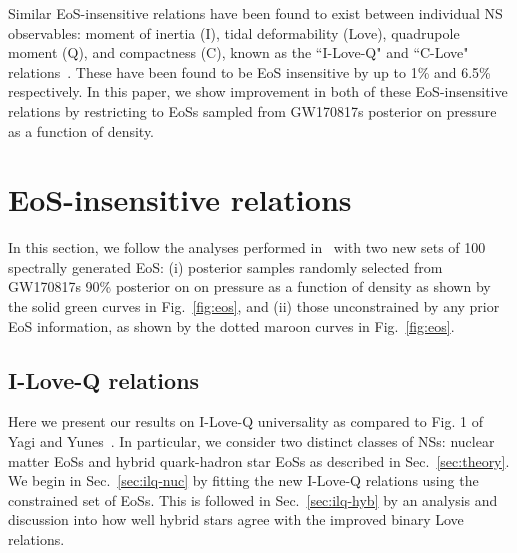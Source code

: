 \documentclass[prd,twocolumn,nofootinbib,superscriptaddress,amsmath,amssymb]{revtex4-1}
\begin{document}
Similar EoS-insensitive relations have been found to exist between individual NS observables: moment of inertia (I), tidal deformability (Love), quadrupole moment (Q), and compactness (C), known as the ``I-Love-Q" and ``C-Love" relations~\cite{Yagi:ILQ, Yagi:binLove}.
These have been found to be EoS insensitive by up to 1\% and 6.5\% respectively.
In this paper, we show improvement in both of these EoS-insensitive relations by restricting to EoSs sampled from GW170817s posterior on pressure as a function of density.
\section{EoS-insensitive relations}\label{sec:universal}
In this section, we follow the analyses performed in~\cite{Yagi:binLove,Yagi:ILQ} with two new sets of 100 spectrally generated EoS: (i) posterior samples randomly selected from GW170817s 90\% posterior on on pressure as a function of density as shown by the solid green curves in Fig.~\ref{fig:eos}, and (ii) those unconstrained by any prior EoS information, as shown by the dotted maroon curves in Fig.~\ref{fig:eos}.

\subsection{I-Love-Q relations}\label{sec:ilq}
Here we present our results on I-Love-Q universality as compared to Fig. 1 of Yagi and Yunes~\cite{Yagi:ILQ}.
In particular, we consider two distinct classes of NSs: nuclear matter EoSs and hybrid quark-hadron star EoSs as described in Sec.~\ref{sec:theory}.
We begin in Sec.~\ref{sec:ilq-nuc} by fitting the new I-Love-Q relations using the constrained set of EoSs.
This is followed in Sec.~\ref{sec:ilq-hyb} by an analysis and discussion into how well hybrid stars agree with the improved binary Love relations. 

{}
\end{document}
